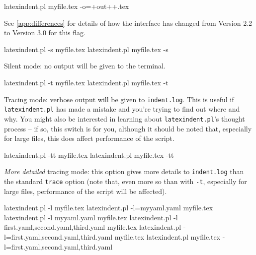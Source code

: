 \documentclass[10pt]{article}
\newcommand{\flagbox}[1]{%
 \par
 \makebox[30pt][l]{%
  \hspace{-1cm}%
  \ttfamily\fontseries{b}\selectfont #1
 }%
}
\begin{document}
 \begin{commandshell}
latexindent.pl myfile.tex -o=+out++.tex
\end{commandshell}

 See \vref{app:differences} for details of how the interface has changed from Version 2.2
 to Version 3.0 for this flag. \flagbox{-s, --silent} 

 \begin{commandshell}
latexindent.pl -s myfile.tex
latexindent.pl myfile.tex -s
\end{commandshell}

 Silent mode: no output will be given to the terminal.

\flagbox{-t, --trace}

 \begin{commandshell}
latexindent.pl -t myfile.tex
latexindent.pl myfile.tex -t
\end{commandshell}

 \label{page:traceswitch}
 Tracing mode: verbose output will be given to \texttt{indent.log}. This is useful if
 \texttt{latexindent.pl} has made a mistake and you're trying to find out where and why.
 You might also be interested in learning about \texttt{latexindent.pl}'s thought process
 -- if so, this switch is for you, although it should be noted that, especially for large
 files, this does affect performance of the script.

\flagbox{-tt, --ttrace}

 \begin{commandshell}
latexindent.pl -tt myfile.tex
latexindent.pl myfile.tex -tt
\end{commandshell}

 \emph{More detailed} tracing mode: this option gives more details to
 \texttt{indent.log}
 than the standard \texttt{trace} option (note that, even more so than with \texttt{-t},
 especially for large files, performance of the script will be affected).

\flagbox{-l, --local[=myyaml.yaml,other.yaml,...]}

 \begin{commandshell}
latexindent.pl -l myfile.tex
latexindent.pl -l=myyaml.yaml myfile.tex
latexindent.pl -l myyaml.yaml myfile.tex
latexindent.pl -l first.yaml,second.yaml,third.yaml myfile.tex
latexindent.pl -l=first.yaml,second.yaml,third.yaml myfile.tex
latexindent.pl myfile.tex -l=first.yaml,second.yaml,third.yaml 
\end{commandshell}
\end{document}
